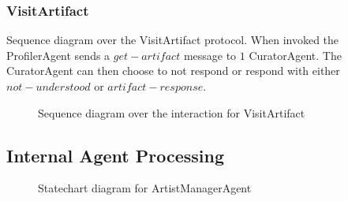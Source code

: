 \documentclass[paper=letter, fontsize=12pt]{article}
\begin{document}
\subsubsection{VisitArtifact}
Sequence diagram over the VisitArtifact protocol. When invoked the ProfilerAgent sends a $get-artifact$ message to $1$ CuratorAgent. The CuratorAgent can then choose to not respond or respond with either $not-understood$ or $artifact-response$.
\begin{figure}[H]
  \begin{center}
    \caption{Sequence diagram over the interaction for VisitArtifact}
    \label{fig:visit_artifact_sequence}
  \end{center}
\end{figure}
\subsection{Internal Agent Processing}
\begin{figure}[H]
  \begin{center}
    \caption{Statechart diagram for ArtistManagerAgent}
    \label{fig:artistmanager_state}
  \end{center}
\end{figure}
\end{document}
